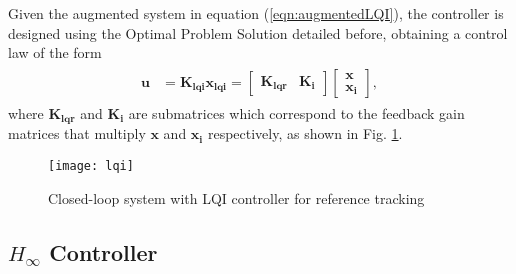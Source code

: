 Given the augmented system in equation (\ref{eqn:augmentedLQI}), the controller is designed using the Optimal Problem Solution detailed before, obtaining a control law of the form
\begin{align}
\begin{split}
\mathbf{u} & = \mathbf{K_{lqi}}\mathbf{x_{lqi}} =\begin{bmatrix}
\mathbf{K_{lqr}} & \mathbf{K_{i}}
\end{bmatrix}\begin{bmatrix}
\mathbf{x} \\
\mathbf{x_i}
\end{bmatrix},
\end{split}
\end{align}
where $\mathbf{K_{lqr}}$ and $\mathbf{K_i}$ are  submatrices which correspond to the feedback gain matrices that multiply $\mathbf{x}$ and $\mathbf{x_i}$ respectively, as shown in Fig. \ref{fig:lqi}.
	\begin{figure}[h]
	\begin{center}
	\texttt{[image: lqi]}
	\caption{Closed-loop system with LQI controller for reference tracking}
	\label{fig:lqi}
	\end{center}
	\end{figure}


\subsection{$H_\infty$ Controller}
